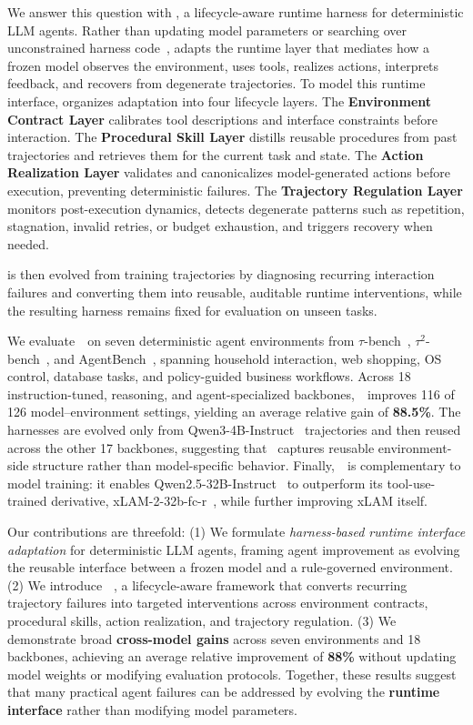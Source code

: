 We answer this question with \method{}, a lifecycle-aware runtime harness for deterministic LLM agents. 
Rather than updating model parameters or searching over unconstrained harness code~\cite{lee2026meta_Meta-harness}, \method{} adapts the runtime layer that mediates how a frozen model observes the environment, uses tools, realizes actions, interprets feedback, and recovers from degenerate trajectories. 
To model this runtime interface, \method{} organizes adaptation into four lifecycle layers. 
The \textbf{Environment Contract Layer} calibrates tool descriptions and interface constraints before interaction. 
The \textbf{Procedural Skill Layer} distills reusable procedures from past trajectories and retrieves them for the current task and state. 
The \textbf{Action Realization Layer} validates and canonicalizes model-generated actions before execution, preventing deterministic failures. 
The \textbf{Trajectory Regulation Layer} monitors post-execution dynamics, detects degenerate patterns such as repetition, stagnation, invalid retries, or budget exhaustion, and triggers recovery when needed. 

\method{} is then evolved from training trajectories by diagnosing recurring interaction failures and converting them into reusable, auditable runtime interventions, while the resulting harness remains fixed for evaluation on unseen tasks.

We evaluate~\method~on seven deterministic agent environments from $\tau$-bench~\cite{yao2024tau_tau-bench}, $\tau^2$-bench~\cite{barres2025tau_tau2-bench}, and AgentBench~\cite{liu2024agentbench}, spanning household interaction, web shopping, OS control, database tasks, and policy-guided business workflows. 
Across 18 instruction-tuned, reasoning, and agent-specialized backbones,~\method~improves 116 of 126 model--environment settings, yielding an average relative gain of \textbf{88.5\%}. 
The harnesses are evolved only from Qwen3-4B-Instruct~\cite{qwen3technicalreport} trajectories and then reused across the other 17 backbones, suggesting that~\method{} captures reusable environment-side structure rather than model-specific behavior.
Finally,~\method~is complementary to model training: it enables Qwen2.5-32B-Instruct~\cite{qwen2.5} to outperform its tool-use-trained derivative, xLAM-2-32b-fc-r~\cite{prabhakar2026apigen_Salesforce_xLAM2}, while further improving xLAM itself. 

Our contributions are threefold: 
(1) We formulate \emph{harness-based runtime interface adaptation} for deterministic LLM agents, framing agent improvement as evolving the reusable interface between a frozen model and a rule-governed environment. 
(2) We introduce \textbf{~\method}, a lifecycle-aware framework that converts recurring trajectory failures into targeted interventions across {environment contracts}, {procedural skills}, {action realization}, and {trajectory regulation}. 
(3) We demonstrate broad \textbf{cross-model gains} across seven environments and 18 backbones, achieving an average relative improvement of \textbf{88\%} without updating model weights or modifying evaluation protocols.  
Together, these results suggest that many practical agent failures can be addressed by evolving the \textbf{runtime interface} rather than modifying model parameters.
